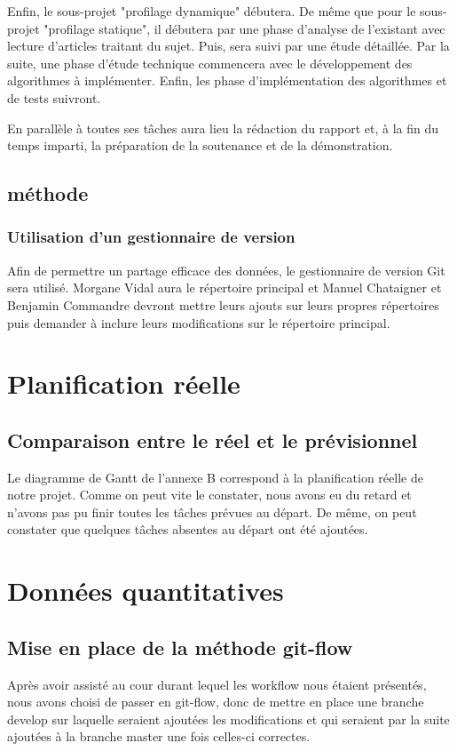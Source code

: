 \documentclass{report}
\begin{document}
Enfin, le sous-projet "profilage dynamique" débutera. De même que pour le sous-projet "profilage statique", il débutera par une phase d'analyse de l'existant avec lecture d'articles traitant du sujet. Puis, sera suivi par une étude détaillée. Par la suite, une phase d'étude technique commencera avec le développement des algorithmes à implémenter. Enfin, les phase d'implémentation des algorithmes et de tests suivront.\par
En parallèle à toutes ses tâches aura lieu la rédaction du rapport et, à la fin du temps imparti, la préparation de la soutenance et de la démonstration. \par

\section{méthode}
\subsection{Utilisation d'un gestionnaire de version}
\hspace{0.5cm}Afin de permettre un partage efficace des données, le gestionnaire de version Git sera utilisé. Morgane Vidal aura le répertoire principal et Manuel Chataigner et Benjamin Commandre devront mettre leurs ajouts sur leurs propres répertoires puis demander à inclure leurs modifications sur le répertoire principal.

\chapter{Planification réelle}
\section{Comparaison entre le réel et le prévisionnel}
\hspace{0.5cm}Le diagramme de Gantt de l'annexe B correspond à la planification réelle de notre projet. Comme on peut vite le constater, nous avons eu du retard et n'avons pas pu finir toutes les tâches prévues au départ. De même, on peut constater que quelques tâches absentes au départ ont été ajoutées.\par


\chapter{Données quantitatives}
\section{Mise en place de la méthode git-flow}
\hspace{0.5cm}Après avoir assisté au cour durant lequel les workflow nous étaient présentés, nous avons choisi de passer en git-flow, donc de mettre en place une branche develop sur laquelle seraient ajoutées les modifications et qui seraient par la suite ajoutées à la branche master une fois celles-ci correctes.\par
\end{document}
